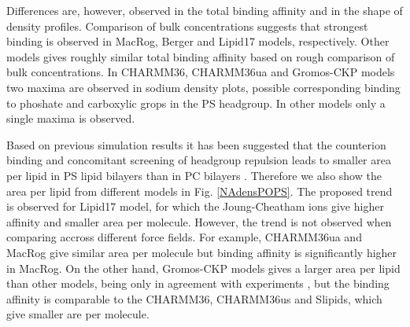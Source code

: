 \documentclass[aps,prl,superscriptaddress,twocolumn]{revtex4}
\begin{document}
Differences are, however,
observed in the total binding affinity and in the shape of density profiles.
Comparison of bulk concentrations suggests that strongest binding
is observed in MacRog, Berger and Lipid17 models, respectively.
Other models gives roughly similar total binding affinity
based on rough comparison of bulk concentrations.
In CHARMM36, CHARMM36ua and Gromos-CKP models two maxima are observed
in sodium density plots, possible corresponding binding to phoshate
and carboxylic grops in the PS headgroup. In other models only
a single maxima is observed. 

Based on previous simulation results it has been suggested that
the counterion binding and concomitant screening of headgroup repulsion
leads to smaller area per lipid in PS lipid bilayers than in PC
bilayers \cite{pandit02,mukhopadhyay04,pedersen06}. Therefore we also show the area per lipid from different models
in Fig. \ref{NAdensPOPS}. The proposed trend is observed for Lipid17 model,
for which the Joung-Cheatham ions give higher affinity and smaller area
per molecule. However, the trend is not observed when comparing accross different
force fields. For example, CHARMM36ua and MacRog give similar area per molecule
but binding affinity is significantly higher in MacRog. On the other hand,
Gromos-CKP models gives a larger area per lipid than other models, being only
in agreement with experiments \cite{pan14}, but the binding affinity is comparable
to the CHARMM36, CHARMM36us and Slipids, which give smaller are per molecule.
\end{document}
